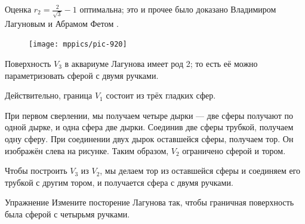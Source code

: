 Оценка $r_2=\tfrac2{\sqrt{3}}-1$ оптимальна;
это и прочее было доказано Владимиром Лагуновым и Абрамом Фетом \cite{lagunov-1960, lagunov-fet-1963, lagunov-fet-1965}.

\begin{figure}
\centering
\vskip-0mm
\texttt{[image: mppics/pic-920]}
\vskip0mm
\end{figure}

Поверхность $V_3$ в аквариуме Лагунова имеет род 2; то есть её можно параметризовать сферой с двумя ручками.

Действительно, граница $V_1$ состоит из трёх гладких сфер.

При первом сверлении, мы получаем четыре дырки --- две сферы получают по одной дырке, и одна сфера две дырки.
Соединив две сферы трубкой, получаем одну сферу.
При соединении двух дырок оставшейся сферы, получаем тор.
Он изображён слева на рисунке.
Таким образом, $V_2$ ограничено сферой и тором.

Чтобы построить $V_3$ из $V_2$, мы делаем тор из оставшейся сферы и соединяем его трубкой с другим тором, и получается сфера с двумя ручками.

\begin{thm}{Упражнение}\label{ex:lagunov-genus4}
Измените посторение Лагунова так, чтобы граничная поверхность была сферой с четырьмя ручками.
\end{thm}




